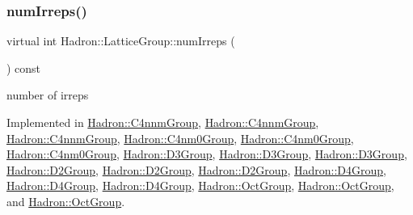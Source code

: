 \mbox{\label{structHadron_1_1LatticeGroup_a3edaca488144b5d2a9cf73fe653add34}} 
\subsubsection{\texorpdfstring{numIrreps()}{numIrreps()}\hspace{0.1cm}{\footnotesize\ttfamily [1/3]}}
{\footnotesize\ttfamily virtual int Hadron\+::\+Lattice\+Group\+::num\+Irreps (\begin{DoxyParamCaption}{ }\end{DoxyParamCaption}) const\hspace{0.3cm}{\ttfamily [pure virtual]}}

number of irreps 

Implemented in \mbox{\hyperlink{structHadron_1_1C4nnmGroup_a70b7d429c62a7f1b2ed77cbc3566ea42}{Hadron\+::\+C4nnm\+Group}}, \mbox{\hyperlink{structHadron_1_1C4nnmGroup_a70b7d429c62a7f1b2ed77cbc3566ea42}{Hadron\+::\+C4nnm\+Group}}, \mbox{\hyperlink{structHadron_1_1C4nnmGroup_a70b7d429c62a7f1b2ed77cbc3566ea42}{Hadron\+::\+C4nnm\+Group}}, \mbox{\hyperlink{structHadron_1_1C4nm0Group_ac77e1943ad8fa5f9211d31dc34ee3f6c}{Hadron\+::\+C4nm0\+Group}}, \mbox{\hyperlink{structHadron_1_1C4nm0Group_ac77e1943ad8fa5f9211d31dc34ee3f6c}{Hadron\+::\+C4nm0\+Group}}, \mbox{\hyperlink{structHadron_1_1C4nm0Group_ac77e1943ad8fa5f9211d31dc34ee3f6c}{Hadron\+::\+C4nm0\+Group}}, \mbox{\hyperlink{structHadron_1_1D3Group_a33e3822d1ec56e4928e5bc47b655f69f}{Hadron\+::\+D3\+Group}}, \mbox{\hyperlink{structHadron_1_1D3Group_a33e3822d1ec56e4928e5bc47b655f69f}{Hadron\+::\+D3\+Group}}, \mbox{\hyperlink{structHadron_1_1D3Group_a33e3822d1ec56e4928e5bc47b655f69f}{Hadron\+::\+D3\+Group}}, \mbox{\hyperlink{structHadron_1_1D2Group_a24644ff5f0fc06adeb26457c9ce772a5}{Hadron\+::\+D2\+Group}}, \mbox{\hyperlink{structHadron_1_1D2Group_a24644ff5f0fc06adeb26457c9ce772a5}{Hadron\+::\+D2\+Group}}, \mbox{\hyperlink{structHadron_1_1D2Group_a24644ff5f0fc06adeb26457c9ce772a5}{Hadron\+::\+D2\+Group}}, \mbox{\hyperlink{structHadron_1_1D4Group_ae8b007038fb1aa79a7267feebf356d4c}{Hadron\+::\+D4\+Group}}, \mbox{\hyperlink{structHadron_1_1D4Group_ae8b007038fb1aa79a7267feebf356d4c}{Hadron\+::\+D4\+Group}}, \mbox{\hyperlink{structHadron_1_1D4Group_ae8b007038fb1aa79a7267feebf356d4c}{Hadron\+::\+D4\+Group}}, \mbox{\hyperlink{structHadron_1_1OctGroup_aed56aa6c4ed7e2a82048b478c916b9d2}{Hadron\+::\+Oct\+Group}}, \mbox{\hyperlink{structHadron_1_1OctGroup_aed56aa6c4ed7e2a82048b478c916b9d2}{Hadron\+::\+Oct\+Group}}, and \mbox{\hyperlink{structHadron_1_1OctGroup_aed56aa6c4ed7e2a82048b478c916b9d2}{Hadron\+::\+Oct\+Group}}.

